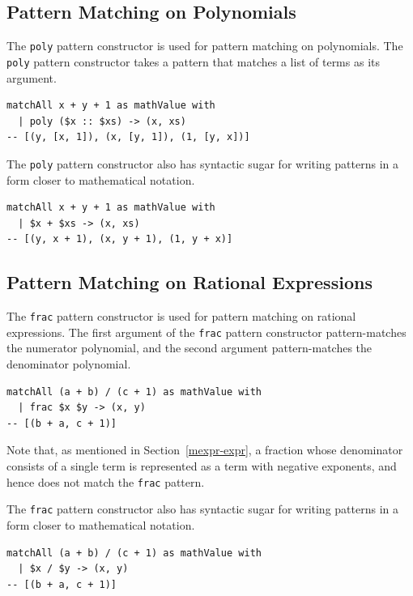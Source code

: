 \subsection{Pattern Matching on Polynomials}

The \lstinline{poly} pattern constructor is used for pattern matching on polynomials.
The \lstinline{poly} pattern constructor takes a pattern that matches a list of terms as its argument.
\begin{lstlisting}[language=egison,numbers=none]
matchAll x + y + 1 as mathValue with
  | poly ($x :: $xs) -> (x, xs)
-- [(y, [x, 1]), (x, [y, 1]), (1, [y, x])]
\end{lstlisting}

The \lstinline{poly} pattern constructor also has syntactic sugar for writing patterns in a form closer to mathematical notation.
\begin{lstlisting}[language=egison,numbers=none]
matchAll x + y + 1 as mathValue with
  | $x + $xs -> (x, xs)
-- [(y, x + 1), (x, y + 1), (1, y + x)]
\end{lstlisting}

\subsection{Pattern Matching on Rational Expressions}

The \lstinline{frac} pattern constructor is used for pattern matching on rational expressions.
The first argument of the \lstinline{frac} pattern constructor pattern-matches the numerator polynomial, and the second argument pattern-matches the denominator polynomial.
\begin{lstlisting}[language=egison,numbers=none]
matchAll (a + b) / (c + 1) as mathValue with
  | frac $x $y -> (x, y)
-- [(b + a, c + 1)]
\end{lstlisting}
Note that, as mentioned in Section~\ref{mexpr-expr}, a fraction whose denominator consists of a single term is represented as a term with negative exponents, and hence does not match the \lstinline{frac} pattern.

The \lstinline{frac} pattern constructor also has syntactic sugar for writing patterns in a form closer to mathematical notation.
\begin{lstlisting}[language=egison,numbers=none]
matchAll (a + b) / (c + 1) as mathValue with
  | $x / $y -> (x, y)
-- [(b + a, c + 1)]
\end{lstlisting}
